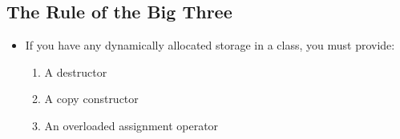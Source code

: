 \subsection{The Rule of the Big Three}
\begin{itemize}
	\item If you have any dynamically allocated storage in a class, you must provide:
	\begin{enumerate}
		\item A destructor
		\item A copy constructor
		\item An overloaded assignment operator
	\end{enumerate}
\end{itemize}